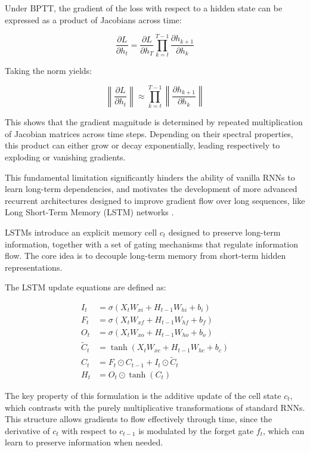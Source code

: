 Under BPTT, the gradient of the loss with respect to a hidden state can be expressed as a product of Jacobians across time:

\begin{equation*}
\frac{\partial L}{\partial h_t}
=
\frac{\partial L}{\partial h_T}
\prod_{k=t}^{T-1}
\frac{\partial h_{k+1}}{\partial h_k}
\end{equation*}

Taking the norm yields:

\begin{equation*}
\left\|\frac{\partial L}{\partial h_t}\right\|
\approx
\prod_{k=t}^{T-1}
\left\|\frac{\partial h_{k+1}}{\partial h_k}\right\|
\end{equation*}

This shows that the gradient magnitude is determined by repeated multiplication of Jacobian matrices across time steps. Depending on their spectral properties, this product can either grow or decay exponentially, leading respectively to exploding or vanishing gradients.

This fundamental limitation significantly hinders the ability of vanilla RNNs to learn long-term dependencies, and motivates the development of more advanced recurrent architectures designed to improve gradient flow over long sequences, like Long Short-Term Memory (LSTM) networks \cite{hochreiter1997long}. 

LSTMs introduce an explicit memory cell $c_t$ designed to preserve long-term information, together with a set of gating mechanisms that regulate information flow. The core idea is to decouple long-term memory from short-term hidden representations.

The LSTM update equations are defined as:


\begin{align*}
I_t &= \sigma(X_t W_{xi} + H_{t-1} W_{hi} + b_i) \\
F_t &= \sigma(X_t W_{xf} + H_{t-1} W_{hf} + b_f) \\
O_t &= \sigma(X_t W_{xo} + H_{t-1} W_{ho} + b_o) \\
\tilde{C}_t &= \tanh(X_t W_{xc} + H_{t-1} W_{hc} + b_c) \\
C_t &= F_t \odot C_{t-1} + I_t \odot \tilde{C}_t \\
H_t &= O_t \odot \tanh(C_t)
\end{align*}

The key property of this formulation is the additive update of the cell state $c_t$, which contrasts with the purely multiplicative transformations of standard RNNs. This structure allows gradients to flow effectively through time, since the derivative of $c_t$ with respect to $c_{t-1}$ is modulated by the forget gate $f_t$, which can learn to preserve information when needed.

